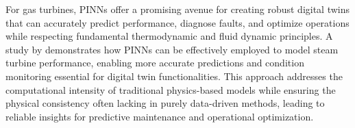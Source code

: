 \documentclass[
  12pt,
  oneside,
  a4paper,
  english,
  brazil]{abntex2}
\begin{document}
For gas turbines, PINNs offer a promising avenue for creating robust
digital twins that can accurately predict performance, diagnose faults,
and optimize operations while respecting fundamental thermodynamic and
fluid dynamic principles. A study by \citet{wang2023physics}
demonstrates how PINNs can be effectively employed to model steam
turbine performance, enabling more accurate predictions and condition
monitoring essential for digital twin functionalities. This approach
addresses the computational intensity of traditional physics-based
models while ensuring the physical consistency often lacking in purely
data-driven methods, leading to reliable insights for predictive
maintenance and operational optimization.



\end{document}

